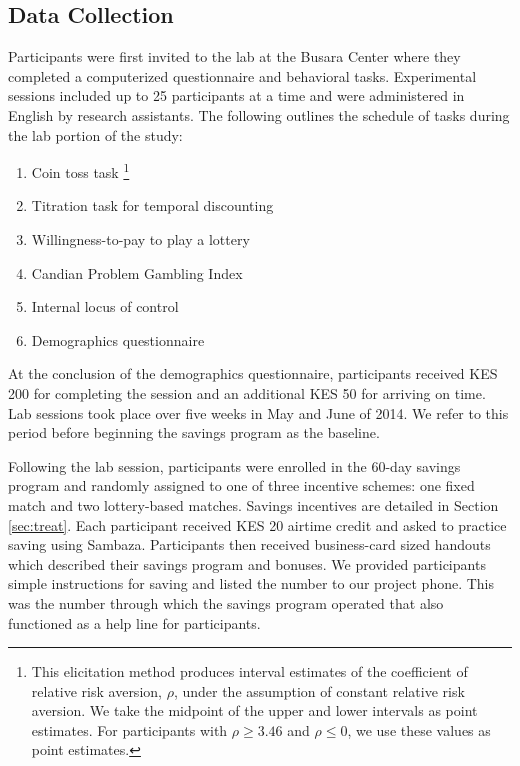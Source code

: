\documentclass[12pt]{article}
\begin{document}
	\subsection{Data Collection}

		Participants were first invited to the lab at the Busara Center where they completed a computerized questionnaire and behavioral tasks. Experimental sessions included up to 25 participants at a time and were administered in English by research assistants. The following outlines the schedule of tasks during the lab portion of the study:

		\begin{enumerate} \setlength{\itemsep}{1pt}
		\item Coin toss task \footnote{This elicitation method produces interval estimates of the coefficient of relative risk aversion, $\rho$, under the assumption of constant relative risk aversion. We take the midpoint of the upper and lower intervals as point estimates. For participants with $\rho \geq 3.46$ and $\rho \leq 0$, we use these values as point estimates.}
		\item Titration task for temporal discounting 
		\item Willingness-to-pay to play a lottery
		\item Candian Problem Gambling Index 
		\item Internal locus of control 
		\item Demographics questionnaire
		\end{enumerate}

		At the conclusion of the demographics questionnaire, participants received KES 200 for completing the session and an additional KES 50 for arriving on time. Lab sessions took place over five weeks in May and June of 2014. We refer to this period before beginning the savings program as the baseline.

		Following the lab session, participants were enrolled in the 60-day savings program and randomly assigned to one of three incentive schemes: one fixed match and two lottery-based matches. Savings incentives are detailed in Section \ref{sec:treat}. Each participant received KES 20 airtime credit and asked to practice saving using Sambaza. Participants then received business-card sized handouts which described their savings program and bonuses. We provided participants simple instructions for saving and listed the number to our project phone. This was the number through which the savings program operated that also functioned as a help line for participants.
\end{document}
